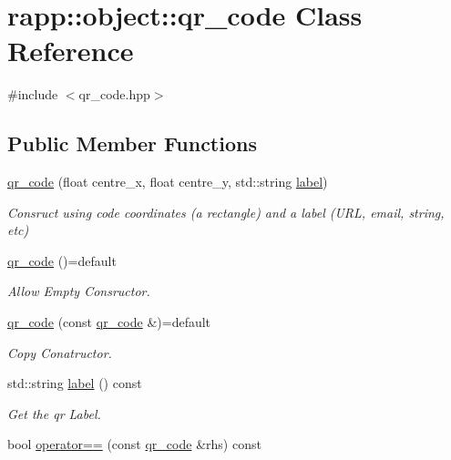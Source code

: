 \hypertarget{classrapp_1_1object_1_1qr__code}{\section{rapp\-:\-:object\-:\-:qr\-\_\-code Class Reference}
\label{classrapp_1_1object_1_1qr__code}
}


{\ttfamily \#include $<$qr\-\_\-code.\-hpp$>$}

\subsection*{Public Member Functions}
\begin{DoxyCompactItemize}
\item 
\hyperlink{classrapp_1_1object_1_1qr__code_a4b67f58a2ab9aa5469535be5fca9ac24}{qr\-\_\-code} (float centre\-\_\-x, float centre\-\_\-y, std\-::string \hyperlink{classrapp_1_1object_1_1qr__code_ad2298e44f6c2373814c5e494a404478a}{label})
\begin{DoxyCompactList}\small\item\em Consruct using code coordinates (a rectangle) and a label (U\-R\-L, email, string, etc) \end{DoxyCompactList}\item 
\hyperlink{classrapp_1_1object_1_1qr__code_a0eb67b8035200345e21aec74b0f4ea72}{qr\-\_\-code} ()=default
\begin{DoxyCompactList}\small\item\em Allow Empty Consructor. \end{DoxyCompactList}\item 
\hyperlink{classrapp_1_1object_1_1qr__code_ab2d3e54e4f22a03e44bd288882631627}{qr\-\_\-code} (const \hyperlink{classrapp_1_1object_1_1qr__code}{qr\-\_\-code} \&)=default
\begin{DoxyCompactList}\small\item\em Copy Conatructor. \end{DoxyCompactList}\item 
std\-::string \hyperlink{classrapp_1_1object_1_1qr__code_ad2298e44f6c2373814c5e494a404478a}{label} () const 
\begin{DoxyCompactList}\small\item\em Get the qr Label. \end{DoxyCompactList}\item 
bool \hyperlink{classrapp_1_1object_1_1qr__code_ad99a9dcdb8d8335c8c144e7f20aa0944}{operator==} (const \hyperlink{classrapp_1_1object_1_1qr__code}{qr\-\_\-code} \&rhs) const 
\end{DoxyCompactItemize}
